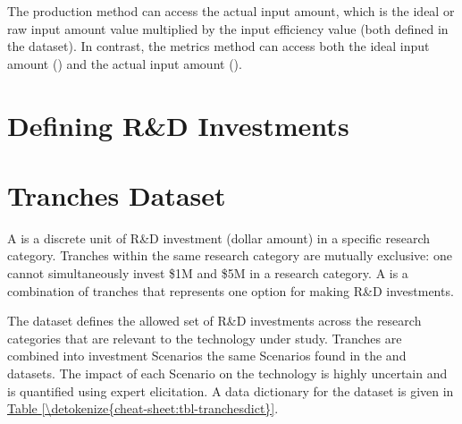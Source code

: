 \documentclass[letterpaper,10pt,english]{sphinxmanual}
\begin{document}
The production method can access the actual input amount, which is the ideal or raw input amount value multiplied by the input efficiency value (both defined in the  dataset). In contrast, the metrics method can access both the ideal input amount () and the actual input amount ().


\section{Defining R\&D Investments}
\label{\detokenize{cheat-sheet:defining-r-d-investments}}

\section{Tranches Dataset}
\label{\detokenize{cheat-sheet:tranches-dataset}}
A  is a discrete unit of R\&D investment (dollar amount) in a specific research category. Tranches within the same research category are mutually exclusive: one cannot simultaneously invest \$1M and \$5M in a research category. A  is a combination of tranches that represents one option for making R\&D investments.

The  dataset defines the allowed set of R\&D investments across the research categories that are relevant to the technology under study. Tranches are combined into investment Scenarios \textendash{} the same Scenarios found in the  and  datasets. The impact of each Scenario on the technology is highly uncertain and is quantified using expert elicitation. A data dictionary for the  dataset is given in \hyperref[\detokenize{cheat-sheet:tbl-tranchesdict}]{Table \ref{\detokenize{cheat-sheet:tbl-tranchesdict}}}.
\end{document}
